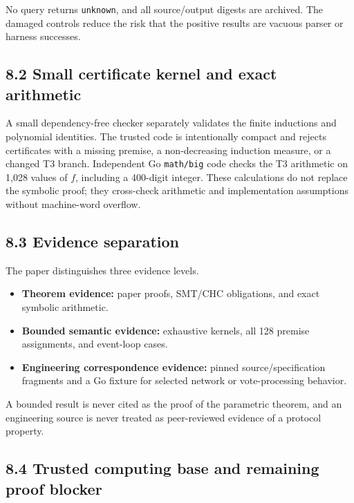 \documentclass[10pt,a4paper]{article}
\newcommand{\tightlist}{\setlength{\itemsep}{0pt}\setlength{\parskip}{0pt}}
\begin{document}
No query returns \texttt{unknown}, and all source/output digests are
archived. The damaged controls reduce the risk that the positive results
are vacuous parser or harness successes.

\subsection{8.2 Small certificate kernel and exact
arithmetic}\label{small-certificate-kernel-and-exact-arithmetic}

A small dependency-free checker separately validates the finite
inductions and polynomial identities. The trusted code is intentionally
compact and rejects certificates with a missing premise, a
non-decreasing induction measure, or a changed T3 branch. Independent Go
\texttt{math/big} code checks the T3 arithmetic on 1,028 values of
\(f\), including a 400-digit integer. These calculations do not replace
the symbolic proof; they cross-check arithmetic and implementation
assumptions without machine-word overflow.

\subsection{8.3 Evidence separation}\label{evidence-separation}

The paper distinguishes three evidence levels.

\begin{itemize}
\tightlist
\item
  \textbf{Theorem evidence:} paper proofs, SMT/CHC obligations, and
  exact symbolic arithmetic.
\item
  \textbf{Bounded semantic evidence:} exhaustive kernels, all 128
  premise assignments, and event-loop cases.
\item
  \textbf{Engineering correspondence evidence:} pinned
  source/specification fragments and a Go fixture for selected network
  or vote-processing behavior.
\end{itemize}

A bounded result is never cited as the proof of the parametric theorem,
and an engineering source is never treated as peer-reviewed evidence of
a protocol property.

\subsection{8.4 Trusted computing base and remaining proof
blocker}\label{trusted-computing-base-and-remaining-proof-blocker}
\end{document}
